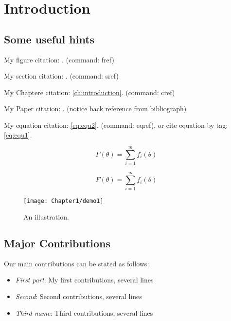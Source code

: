 
\chapter{Introduction} %
\label{ch:introduction} %


\section{Some useful hints}

My figure citation: . (command: fref)

My section citation: . (command: sref)

My Chaptere citation: \cref{ch:introduction}. (command: cref)

My Paper citation: \cite{bauschke2011convex}. (notice back reference from bibliograph)

My equation citation: \eqref{eq:equ2}. (command: eqref), or cite equation by tag: \eqref{eq:equ1}.

\begin{equation}\label{eq:equ1}
F(\theta)=\sum_{i=1}^mf_i(\theta) \tag{DOP}
\end{equation}

\begin{equation}\label{eq:equ2}
F(\theta)=\sum_{i=1}^mf_i(\theta)
\end{equation}

\begin{figure}[htbp]
  \centering
    \texttt{[image: Chapter1/demo1]}
  \caption{An illustration.}
  \label{fig:demo1}
\end{figure}



\section{Major Contributions}\label{sec:contribution}
Our main contributions can be stated as follows:
\begin{itemize}
\item \emph{First part}: My first contributions, several lines


\item \emph{Second}: Second contributions, several lines


\item \emph{Third name}: 
Third contributions, several lines

\end{itemize}

